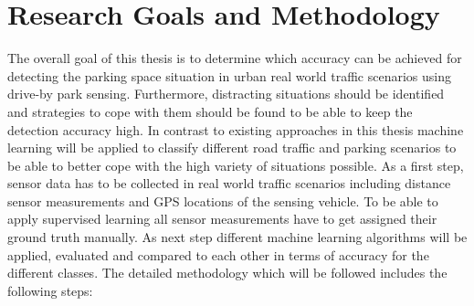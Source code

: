 





\section{Research Goals and Methodology}

The overall goal of this thesis is to determine which accuracy can be achieved for detecting the parking space situation in urban real world traffic scenarios using drive-by park sensing. Furthermore, distracting situations should be identified and strategies to cope with them should be found to be able to keep the detection accuracy high. In contrast to existing approaches in this thesis machine learning will be applied to classify different road traffic and parking scenarios to be able to better cope with the high variety of situations possible. As a first step, sensor data has to be collected in real world traffic scenarios including distance sensor measurements and GPS locations of the sensing vehicle. To be able to apply supervised learning all sensor measurements have to get assigned their ground truth manually. As next step different machine learning algorithms will be applied, evaluated and compared to each other in terms of accuracy for the different classes. The detailed methodology which will be followed includes the following steps:


